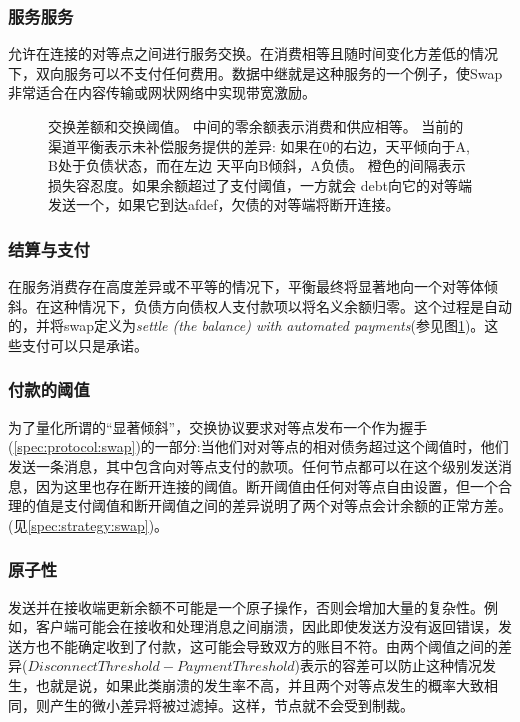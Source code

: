 \subsubsection{服务服务}

允许在连接的对等点之间进行服务交换。在消费相等且随时间变化方差低的情况下，双向服务可以不支付任何费用。数据中继就是这种服务的一个例子，使Swap非常适合在内容传输或网状网络中实现带宽激励。

\begin{figure}[htbp]

\caption[交换差额和交换阈值\statusgreen]{交换差额和交换阈值。
中间的零余额表示消费和供应相等。
当前的渠道平衡表示未补偿服务提供的差异:
如果在0的右边，天平倾向于A, B处于负债状态，而在左边
天平向B倾斜，A负债。
橙色的间隔表示损失容忍度。如果余额超过了支付阈值，一方就会
debt向它的对等端发送一个，如果它到达afdef，欠债的对等端将断开连接。}
\label{fig:swap}
\end{figure}

\subsubsection{结算与支付}

在服务消费存在高度差异或不平等的情况下，平衡最终将显著地向一个对等体倾斜。在这种情况下，负债方向债权人支付款项以将名义余额归零。这个过程是自动的，并将swap定义为\emph{settle (the balance) with automated payments}(参见图\ref{fig:swap})。这些支付可以只是承诺。


\subsubsection{付款的阈值}

为了量化所谓的“显著倾斜”，交换协议要求对等点发布一个作为握手(\ref{spec:protocol:swap})的一部分:当他们对对等点的相对债务超过这个阈值时，他们发送一条消息，其中包含向对等点支付的款项。任何节点都可以在这个级别发送消息，因为这里也存在断开连接的阈值。断开阈值由任何对等点自由设置，但一个合理的值是支付阈值和断开阈值之间的差异说明了两个对等点会计余额的正常方差。(见\ref{spec:strategy:swap})。 


\subsubsection{原子性}

发送并在接收端更新余额不可能是一个原子操作，否则会增加大量的复杂性。例如，客户端可能会在接收和处理消息之间崩溃，因此即使发送方没有返回错误，发送方也不能确定收到了付款，这可能会导致双方的账目不符。由两个阈值之间的差异($\mathit{DisconnectThreshold}-\mathit{PaymentThreshold}$)表示的容差可以防止这种情况发生，也就是说，如果此类崩溃的发生率不高，并且两个对等点发生的概率大致相同，则产生的微小差异将被过滤掉。这样，节点就不会受到制裁。


